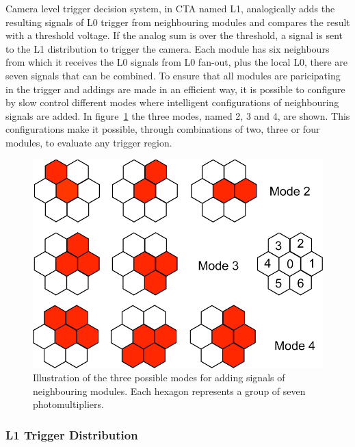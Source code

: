 \documentclass[a4paper,10pt]{book}
\begin{document}
Camera level trigger decision system, in CTA named L1, analogically adds the resulting signals of L0 trigger from neighbouring modules and compares 
the result with a threshold voltage. If the analog sum is over the threshold, a signal is sent to the L1 distribution to trigger
the camera. 
Each module has six neighbours from which it receives the L0 signals from L0 fan-out, plus the local L0, there are seven
signals that can be combined. To ensure that all modules are paricipating in the trigger and addings are made in an efficient way, it is possible
to configure by slow control different modes where intelligent configurations of neighbouring signals are added. In figure~\ref{fig:trigmodes} the three modes,
named 2, 3 and 4, are shown. This configurations make it possible, through combinations of two, three or four modules, to evaluate
any trigger region. 

\begin{figure}
\begin{center}
 \includegraphics[bb=0 0 1296 675,scale=0.25]{./triggermodes.png}
  \caption{Illustration of the three possible modes for adding signals of neighbouring modules. Each hexagon represents a group of seven photomultipliers.}
    \label{fig:trigmodes}
\end{center}
\end{figure}

\subsubsection{L1 Trigger Distribution}
\end{document}
